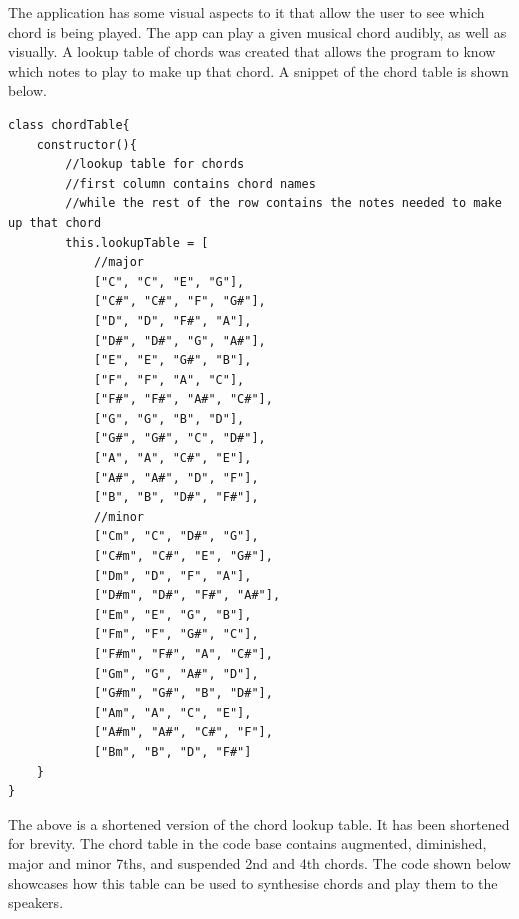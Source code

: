\documentclass[12pt,a4paper]{article}
\begin{document}
		The application has some visual aspects to it that allow the user to see which chord is being played. The app can play a given musical chord audibly, as well as visually. A lookup table
		of chords was created that allows the program to know which notes to play to make up that chord. A snippet of the chord table is shown below.\\
		\begin{lstlisting}
class chordTable{
    constructor(){
        //lookup table for chords
        //first column contains chord names 
        //while the rest of the row contains the notes needed to make up that chord
        this.lookupTable = [
            //major
            ["C", "C", "E", "G"],
            ["C#", "C#", "F", "G#"],
            ["D", "D", "F#", "A"],
            ["D#", "D#", "G", "A#"],
            ["E", "E", "G#", "B"],
            ["F", "F", "A", "C"],
            ["F#", "F#", "A#", "C#"],
            ["G", "G", "B", "D"],
            ["G#", "G#", "C", "D#"],        
            ["A", "A", "C#", "E"],
            ["A#", "A#", "D", "F"],
            ["B", "B", "D#", "F#"],
            //minor
            ["Cm", "C", "D#", "G"],
            ["C#m", "C#", "E", "G#"],
            ["Dm", "D", "F", "A"],
            ["D#m", "D#", "F#", "A#"],
            ["Em", "E", "G", "B"],
            ["Fm", "F", "G#", "C"],
            ["F#m", "F#", "A", "C#"],
            ["Gm", "G", "A#", "D"],
            ["G#m", "G#", "B", "D#"],        
            ["Am", "A", "C", "E"],
            ["A#m", "A#", "C#", "F"],
            ["Bm", "B", "D", "F#"]
	}
}		
		\end{lstlisting}

		The above is a shortened version of the chord lookup table. It has been shortened for brevity. The chord table in the code base contains augmented, diminished, major and minor 7ths, and suspended
		2nd and 4th chords. The code shown below showcases how this table can be used to synthesise chords and play them to the speakers.
\newpage
	
\end{document}
